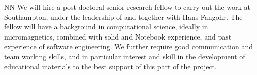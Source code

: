 \begin{participant}[type=R, PM=32]{NN}
  We will hire a post-doctoral senior research fellow to carry out the work
  at Southampton, under the leadership of and together with Hans
  Fangohr. The fellow will have a background in computational science,
  ideally in micromagnetics, combined with solid \IPython and
  \Jupyter{} Notebook experience, and past experience of software
  engineering. We further require good communication and team working
  skills, and in particular interest and skill in the development of
  educational materials to the best support of this part of the project.
\end{participant}